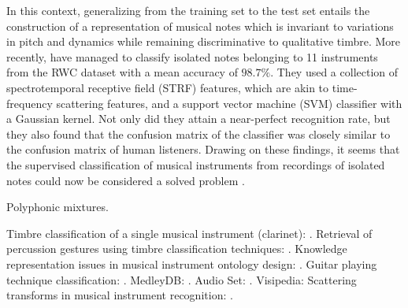\documentclass{article}
\begin{document}
In this context, generalizing from the training set to the test set entails the construction of a representation of musical notes which is invariant to variations in pitch and dynamics while remaining discriminative to qualitative timbre.
More recently, \cite{patil2012plos} have managed to classify isolated notes belonging to 11 instruments from the RWC dataset \cite{goto2003ismir} with a mean accuracy of $98.7\%$.
They used a collection of spectrotemporal receptive field (STRF) features, which are akin to time-frequency scattering features, and a support vector machine (SVM) classifier with a Gaussian kernel.
Not only did they attain a near-perfect recognition rate, but they also found that the confusion matrix of the classifier was closely similar to the confusion matrix of human listeners.
Drawing on these findings, it seems that the supervised classification
of musical instruments from recordings of isolated notes could
now be considered a solved problem \cite{patil2015eurasip}.


Polyphonic mixtures.
\cite{martins2007ismir}





Timbre classification of a single musical instrument (clarinet): \cite{loureiro2004ismir}.
Retrieval of percussion gestures using timbre classification techniques: \cite{tindale2004ismir}.
Knowledge representation issues in musical instrument ontology design: \cite{kolozali2011ismir}.
Guitar playing technique classification: \cite{su2014ismir}.
MedleyDB: \cite{bittner2014ismir}.
Audio Set: \cite{gemmeke2017icassp}.
Visipedia: \cite{belongie2015pattern}
Scattering transforms in musical instrument recognition: \cite{tjoa2010ismir,lostanlen2017phd}.




\end{document}
